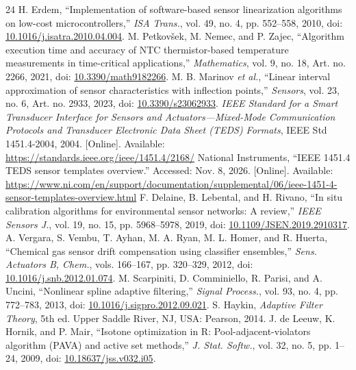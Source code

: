 \begin{thebibliography}{24}
 H. Erdem, ``Implementation of software-based sensor linearization algorithms on low-cost microcontrollers,'' \emph{ISA Trans.}, vol. 49, no. 4, pp. 552--558, 2010, doi: \href{https://doi.org/10.1016/j.isatra.2010.04.004}{10.1016/j.isatra.2010.04.004}.
 M. Petkov\v{s}ek, M. Nemec, and P. Zajec, ``Algorithm execution time and accuracy of NTC thermistor-based temperature measurements in time-critical applications,'' \emph{Mathematics}, vol. 9, no. 18, Art. no. 2266, 2021, doi: \href{https://doi.org/10.3390/math9182266}{10.3390/math9182266}.
 M. B. Marinov \emph{et al.}, ``Linear interval approximation of sensor characteristics with inflection points,'' \emph{Sensors}, vol. 23, no. 6, Art. no. 2933, 2023, doi: \href{https://doi.org/10.3390/s23062933}{10.3390/s23062933}.
 \emph{IEEE Standard for a Smart Transducer Interface for Sensors and Actuators---Mixed-Mode Communication Protocols and Transducer Electronic Data Sheet (TEDS) Formats}, IEEE Std 1451.4-2004, 2004. [Online]. Available: \url{https://standards.ieee.org/ieee/1451.4/2168/}
 National Instruments, ``IEEE 1451.4 TEDS sensor templates overview.'' Accessed: Nov. 8, 2026. [Online]. Available: \url{https://www.ni.com/en/support/documentation/supplemental/06/ieee-1451-4-sensor-templates-overview.html}
 F. Delaine, B. Lebental, and H. Rivano, ``In situ calibration algorithms for environmental sensor networks: A review,'' \emph{IEEE Sensors J.}, vol. 19, no. 15, pp. 5968--5978, 2019, doi: \href{https://doi.org/10.1109/JSEN.2019.2910317}{10.1109/JSEN.2019.2910317}.
 A. Vergara, S. Vembu, T. Ayhan, M. A. Ryan, M. L. Homer, and R. Huerta, ``Chemical gas sensor drift compensation using classifier ensembles,'' \emph{Sens. Actuators B, Chem.}, vols. 166--167, pp. 320--329, 2012, doi: \href{https://doi.org/10.1016/j.snb.2012.01.074}{10.1016/j.snb.2012.01.074}.
 M. Scarpiniti, D. Comminiello, R. Parisi, and A. Uncini, ``Nonlinear spline adaptive filtering,'' \emph{Signal Process.}, vol. 93, no. 4, pp. 772--783, 2013, doi: \href{https://doi.org/10.1016/j.sigpro.2012.09.021}{10.1016/j.sigpro.2012.09.021}.
 S. Haykin, \emph{Adaptive Filter Theory}, 5th ed. Upper Saddle River, NJ, USA: Pearson, 2014.
 J. de Leeuw, K. Hornik, and P. Mair, ``Isotone optimization in R: Pool-adjacent-violators algorithm (PAVA) and active set methods,'' \emph{J. Stat. Softw.}, vol. 32, no. 5, pp. 1--24, 2009, doi: \href{https://doi.org/10.18637/jss.v032.i05}{10.18637/jss.v032.i05}.

\end{thebibliography}
